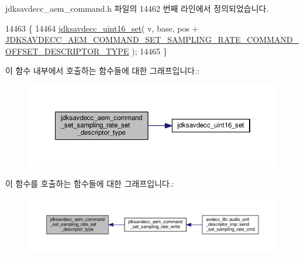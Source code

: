 jdksavdecc\+\_\+aem\+\_\+command.\+h 파일의 14462 번째 라인에서 정의되었습니다.


\begin{DoxyCode}
14463 \{
14464     \hyperlink{group__endian_ga14b9eeadc05f94334096c127c955a60b}{jdksavdecc\_uint16\_set}( v, base, pos + 
      \hyperlink{group__command__set__sampling__rate_gabcd1b26cb4dd9ca2c4f0dfaa7c8aba35}{JDKSAVDECC\_AEM\_COMMAND\_SET\_SAMPLING\_RATE\_COMMAND\_OFFSET\_DESCRIPTOR\_TYPE}
       );
14465 \}
\end{DoxyCode}


이 함수 내부에서 호출하는 함수들에 대한 그래프입니다.\+:
\nopagebreak
\begin{figure}[H]
\begin{center}
\leavevmode
\includegraphics[width=350pt]{group__command__set__sampling__rate_ga7aaff729a629c4f982c24f990f52591b_cgraph}
\end{center}
\end{figure}




이 함수를 호출하는 함수들에 대한 그래프입니다.\+:
\nopagebreak
\begin{figure}[H]
\begin{center}
\leavevmode
\includegraphics[width=350pt]{group__command__set__sampling__rate_ga7aaff729a629c4f982c24f990f52591b_icgraph}
\end{center}
\end{figure}


